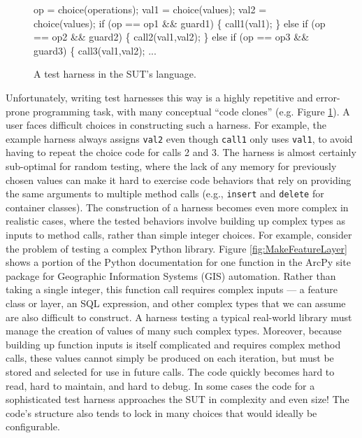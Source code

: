 \begin{figure}[b]
{\scriptsize
\begin{code}
op = choice(operations);
val1 = choice(values);
val2 = choice(values);
if (op == op1 \&\& guard1) \{
    call1(val1);
\} else if (op == op2 \&\& guard2) \{
    call2(val1,val2);
\} else if (op == op3 \&\& guard3) \{
    call3(val1,val2);
...
\end{code}
}
\vspace{-0.15in}
\caption {A test harness in the SUT's language.}
\label{fig:badharness}
\end{figure}

Unfortunately, writing test harnesses this way is a highly repetitive
and error-prone programming task, with many conceptual ``code clones''
(e.g. Figure \ref{fig:badharness}). A user faces difficult choices in
constructing such a harness. For example, the example harness always assigns {\tt val2} even
though {\tt call1} only uses {\tt val1}, to avoid having to repeat the
choice code for calls 2 and 3.  The harness is almost certainly
sub-optimal for  random testing, where the lack of any
memory for previously chosen values can make it hard to exercise code
behaviors that rely on providing the same arguments to multiple method
calls (e.g., {\tt insert} and {\tt delete} for container classes).
The construction of a harness becomes even more complex in realistic
cases, where the tested behaviors involve building up complex types as
inputs to method calls, rather than simple integer choices. For
example, consider the problem of testing a complex Python library.  Figure
\ref{fig:MakeFeatureLayer} shows a portion of the Python documentation for one function in the ArcPy site
package for Geographic Information Systems (GIS) automation.  Rather than taking a single integer, this
function call requires complex inputs --- a feature class or
layer, an SQL expression, and other complex types that we can assume
are also difficult to construct.  A harness testing a typical
real-world library must manage the creation of values of many such complex types.
Moreover, because building up function inputs is itself complicated
and requires complex method calls, these values cannot simply be produced on each iteration, but must be
stored and selected for use in future calls.
The code quickly becomes hard to read, hard to maintain, and hard to
debug.  In some cases \cite{AMAI} the code for a sophisticated test
harness approaches the SUT in complexity and even size!  The code's
structure also tends to lock in many choices that would ideally be configurable.

